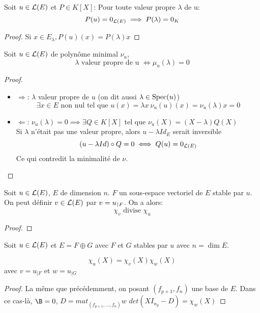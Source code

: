 \begin{prop}
	Soit $u \in \mathcal{L}(E)$ et $P \in K[X]$: Pour toute valeur propre $\lambda$ de u:
	$$ P(u) = 0_{\mathcal{L}(E)} \implies P(\lambda) = 0_K$$
\end{prop}

\begin{proof}
	Si $x \in E_\lambda , P(u)(x) = P(\lambda) x$ %
\end{proof}


\begin{prop}
	Soit $u \in \mathcal{L}(E)$ de polynôme minimal $\nu_u$,
	$$ \lambda \text{ valeur propre de u }\iff \mu_u(\lambda) = 0$$
\end{prop}


\begin{proof}
	\begin{itemize}
		\item  $\Rightarrow$:
		      $\lambda$ valeur propre de $u$ (on dit aussi $\lambda \in \text{Spec}(u)$)
		      $$\exists x \in E \text { non nul tel que } u(x) = \lambda x \ \nu_u(u)(x) = \nu_u(\lambda)x =0$$
		\item $\Leftarrow$:
		      $\nu_u(\lambda) = 0 \implies \exists Q \in K[X]$ tel que $\nu_u(X) = (X - \lambda)Q(X)$\\
		      Si $\lambda$ n'était pas une valeur propre, alors $u-\lambda Id_E$ serait inversible
		      $$ (u-  \lambda Id) \circ Q = 0 \iff Q(u) = 0_{\mathcal{L}(E)}$$
		      Ce qui contredit la minimalité de $\nu$.
	\end{itemize}
\end{proof}



\begin{prop}
	Soit $u \in \mathcal{L}(E)$, $E$ de dimension $n$.
	$F$ un sous-espace vectoriel de $E$ stable par $u$.
	On peut définir $v \in \mathcal{L}(E)$ par $v = u_{\restriction F}$. On a alors:
	$$\chi_v \text{ divise } \chi_u$$
\end{prop}

\begin{proof}
\end{proof}

\begin{prop}
	Soit $u \in \mathcal{L}(E)$ et $E = F \oplus G$ avec $F$ et $G$ stables par $u$ avec $n = \dim E$.

	$$\chi_u (X)= \chi_v (X) \chi_w(X)$$
	avec $v = u_{|F}$ et $w = u_{|G}$
\end{prop}

\begin{proof}
	La même que précédemment, on posant $(f_{p+1}, f_n)$ une base de $E$.
	Dans ce cas-là, $\B = 0$, $D = mat_{(f_{p+1}, \dots, f_n)} w$
	$det(XI_{n_p} - D) = \chi_w(X)$
\end{proof}

